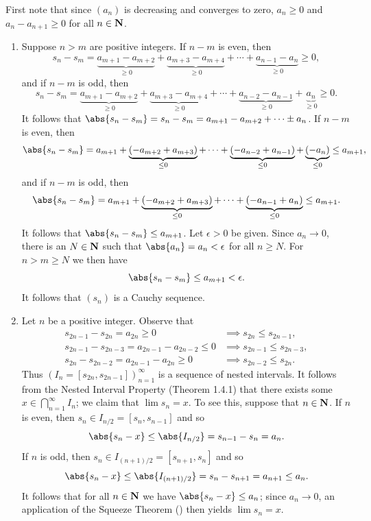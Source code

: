 \documentclass{lew98_solutions}
\begin{document}
\begin{solution}
    First note that since \( (a_n) \) is decreasing and converges to zero, \( a_n \geq 0 \) and \( a_n - a_{n+1} \geq 0 \) for all \( n \in \mathbf{N} \).
    \begin{enumerate}
        \item Suppose \( n > m \) are positive integers. If \( n - m \) is even, then
        \[
            s_n - s_m = \underbrace{a_{m+1} - a_{m+2}}_{\geq 0} + \underbrace{a_{m+3} - a_{m+4}}_{\geq 0} + \cdots + \underbrace{a_{n-1} - a_n}_{\geq 0} \geq 0,
        \]
        and if \( n - m \) is odd, then
        \[
            s_n - s_m = \underbrace{a_{m+1} - a_{m+2}}_{\geq 0} + \underbrace{a_{m+3} - a_{m+4}}_{\geq 0} + \cdots + \underbrace{a_{n-2} - a_{n-1}}_{\geq 0} + \underbrace{a_n}_{\geq 0} \geq 0.
        \]
        It follows that \( \abs{s_n - s_m} = s_n - s_m = a_{m+1} - a_{m+2} + \cdots \pm a_n \). If \( n - m \) is even, then
        \[
            \abs{s_n - s_m} = a_{m+1} + \underbrace{(-a_{m+2} + a_{m+3})}_{\leq 0} + \cdots + \underbrace{(-a_{n-2} + a_{n-1})}_{\leq 0} + \underbrace{(-a_n)}_{\leq 0} \leq a_{m+1},
        \]
        and if \( n - m \) is odd, then
        \[
            \abs{s_n - s_m} = a_{m+1} + \underbrace{(-a_{m+2} + a_{m+3})}_{\leq 0} + \cdots + \underbrace{(-a_{n-1} + a_n)}_{\leq 0} \leq a_{m+1}.
        \]
        It follows that \( \abs{s_n - s_m} \leq a_{m+1} \). Let \( \epsilon > 0 \) be given. Since \( a_n \to 0 \), there is an \( N \in \mathbf{N} \) such that \( \abs{a_n} = a_n < \epsilon \) for all \( n \geq N \). For \( n > m \geq N \) we then have
        \[
            \abs{s_n - s_m} \leq a_{m+1} < \epsilon.
        \]
        It follows that \( (s_n) \) is a Cauchy sequence.

        \item Let \( n \) be a positive integer. Observe that
        \begin{align*}
            s_{2n-1} - s_{2n} = a_{2n} \geq 0 &\implies s_{2n} \leq s_{2n-1}, \\[2mm]
            s_{2n-1} - s_{2n-3} = a_{2n-1} - a_{2n-2} \leq 0 &\implies s_{2n-1} \leq s_{2n-3}, \\[2mm]
            s_{2n} - s_{2n-2} = a_{2n-1} - a_{2n} \geq 0 &\implies s_{2n-2} \leq s_{2n}.
        \end{align*}
        Thus \( (I_n = [s_{2n}, s_{2n-1}])_{n=1}^{\infty} \) is a sequence of nested intervals. It follows from the Nested Interval Property (Theorem 1.4.1) that there exists some \( x \in \bigcap_{n=1}^{\infty} I_n \); we claim that \( \lim s_n = x \). To see this, suppose that \( n \in \mathbf{N} \). If \( n \) is even, then \( s_n \in I_{n/2} = [s_n, s_{n-1}] \) and so
        \[
            \abs{s_n - x} \leq \abs{I_{n/2}} = s_{n-1} - s_n = a_n.
        \]
        If \( n \) is odd, then \( s_n \in I_{(n+1)/2} = [s_{n+1}, s_n] \) and so
        \[
            \abs{s_n - x} \leq \abs{I_{(n+1)/2}} = s_n - s_{n+1} = a_{n+1} \leq a_n.
        \]
        It follows that for all \( n \in \mathbf{N} \) we have \( \abs{s_n - x} \leq a_n \); since \( a_n \to 0 \), an application of the Squeeze Theorem () then yields \( \lim s_n = x \).


\end{enumerate}
\end{solution}
\end{document}
